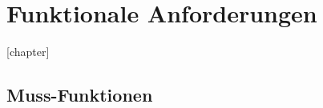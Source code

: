 \chapter{Funktionale Anforderungen}
\label{ch:funktionen}

[chapter]
\setcounter{fanr}{10}
\newcommand{\fano}[1]{\subsection{#1}\addtocounter{fanr}{10}}
\newcommand{\subfano}[1]{\subsubsection{#1}\addtocounter{fanr}{1}}
\renewcommand\thesubsection{/FA\ifnum\value{fanr}<10 000\else\ifnum\value{fanr}<100 00\else\ifnum\value{fanr}<1000 0\fi\fi\fi\arabic{fanr}/}
\renewcommand\thesubsubsection{/FA\ifnum\value{fanr}<10 000\else\ifnum\value{fanr}<100 00\else\ifnum\value{fanr}<1000 0\fi\fi\fi\arabic{fanr}/}

\section{Muss-Funktionen} %

